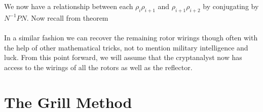 We now have a relationship between each $\rho_i\rho_{i+1}$ and
$\rho_{i+1}\rho_{i+2}$ by conjugating by $N^{-1}PN$. Now recall from
theorem %
\\\\In a similar fashion we can recover the remaining rotor wirings
though often with the help of other mathematical tricks, not to
mention military intelligence and luck. From this point forward, we
will assume that the cryptanalyst now has access to the wirings of
all the rotors as well as the reflector.

\section{The Grill Method}

